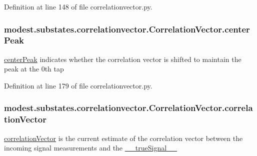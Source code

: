 Definition at line 148 of file correlationvector.\+py.

\subsubsection[{\texorpdfstring{center\+Peak}{centerPeak}}]{\setlength{\rightskip}{0pt plus 5cm}modest.\+substates.\+correlationvector.\+Correlation\+Vector.\+center\+Peak}\hypertarget{classmodest_1_1substates_1_1correlationvector_1_1CorrelationVector_a9dbc1cdcfab963b133537b54f0a6d7a6}{}\label{classmodest_1_1substates_1_1correlationvector_1_1CorrelationVector_a9dbc1cdcfab963b133537b54f0a6d7a6}


\hyperlink{classmodest_1_1substates_1_1correlationvector_1_1CorrelationVector_a9dbc1cdcfab963b133537b54f0a6d7a6}{center\+Peak} indicates whether the correlation vector is shifted to maintain the peak at the 0th tap 



Definition at line 179 of file correlationvector.\+py.

\subsubsection[{\texorpdfstring{correlation\+Vector}{correlationVector}}]{\setlength{\rightskip}{0pt plus 5cm}modest.\+substates.\+correlationvector.\+Correlation\+Vector.\+correlation\+Vector}\hypertarget{classmodest_1_1substates_1_1correlationvector_1_1CorrelationVector_a81da583ee9077067b6aaa354fd8a8c49}{}\label{classmodest_1_1substates_1_1correlationvector_1_1CorrelationVector_a81da583ee9077067b6aaa354fd8a8c49}


\hyperlink{classmodest_1_1substates_1_1correlationvector_1_1CorrelationVector_a81da583ee9077067b6aaa354fd8a8c49}{correlation\+Vector} is the current estimate of the correlation vector between the incoming signal measurements and the \hyperlink{classmodest_1_1substates_1_1correlationvector_1_1CorrelationVector_af2f52cea1c695f36dd100f529c322e94}{\+\_\+\+\_\+true\+Signal\+\_\+\+\_\+} 



